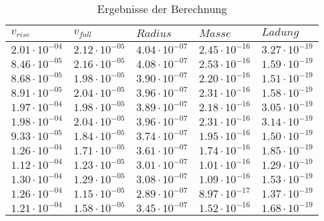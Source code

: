 \begin{table}
\caption{Ergebnisse der Berechnung}
\label{tab:ergebnisse}
\centering
\begin{tabular}{lllll}
\toprule
$v_{rise}$ & $v_{fall}$ & $Radius$ & $Masse$ & $Ladung$ \\
\midrule
$\mathrm{2.01 \cdot 10^{-04}}$ & $\mathrm{2.12 \cdot 10^{-05}}$ & $\mathrm{4.04 \cdot 10^{-07}}$ & $\mathrm{2.45 \cdot 10^{-16}}$ & $\mathrm{3.27 \cdot 10^{-19}}$ \\
$\mathrm{8.46 \cdot 10^{-05}}$ & $\mathrm{2.16 \cdot 10^{-05}}$ & $\mathrm{4.08 \cdot 10^{-07}}$ & $\mathrm{2.53 \cdot 10^{-16}}$ & $\mathrm{1.59 \cdot 10^{-19}}$ \\
$\mathrm{8.68 \cdot 10^{-05}}$ & $\mathrm{1.98 \cdot 10^{-05}}$ & $\mathrm{3.90 \cdot 10^{-07}}$ & $\mathrm{2.20 \cdot 10^{-16}}$ & $\mathrm{1.51 \cdot 10^{-19}}$ \\
$\mathrm{8.91 \cdot 10^{-05}}$ & $\mathrm{2.04 \cdot 10^{-05}}$ & $\mathrm{3.96 \cdot 10^{-07}}$ & $\mathrm{2.31 \cdot 10^{-16}}$ & $\mathrm{1.58 \cdot 10^{-19}}$ \\
$\mathrm{1.97 \cdot 10^{-04}}$ & $\mathrm{1.98 \cdot 10^{-05}}$ & $\mathrm{3.89 \cdot 10^{-07}}$ & $\mathrm{2.18 \cdot 10^{-16}}$ & $\mathrm{3.05 \cdot 10^{-19}}$ \\
$\mathrm{1.98 \cdot 10^{-04}}$ & $\mathrm{2.04 \cdot 10^{-05}}$ & $\mathrm{3.96 \cdot 10^{-07}}$ & $\mathrm{2.31 \cdot 10^{-16}}$ & $\mathrm{3.14 \cdot 10^{-19}}$ \\
$\mathrm{9.33 \cdot 10^{-05}}$ & $\mathrm{1.84 \cdot 10^{-05}}$ & $\mathrm{3.74 \cdot 10^{-07}}$ & $\mathrm{1.95 \cdot 10^{-16}}$ & $\mathrm{1.50 \cdot 10^{-19}}$ \\
$\mathrm{1.26 \cdot 10^{-04}}$ & $\mathrm{1.71 \cdot 10^{-05}}$ & $\mathrm{3.61 \cdot 10^{-07}}$ & $\mathrm{1.74 \cdot 10^{-16}}$ & $\mathrm{1.85 \cdot 10^{-19}}$ \\
$\mathrm{1.12 \cdot 10^{-04}}$ & $\mathrm{1.23 \cdot 10^{-05}}$ & $\mathrm{3.01 \cdot 10^{-07}}$ & $\mathrm{1.01 \cdot 10^{-16}}$ & $\mathrm{1.29 \cdot 10^{-19}}$ \\
$\mathrm{1.30 \cdot 10^{-04}}$ & $\mathrm{1.29 \cdot 10^{-05}}$ & $\mathrm{3.08 \cdot 10^{-07}}$ & $\mathrm{1.09 \cdot 10^{-16}}$ & $\mathrm{1.53 \cdot 10^{-19}}$ \\
$\mathrm{1.26 \cdot 10^{-04}}$ & $\mathrm{1.15 \cdot 10^{-05}}$ & $\mathrm{2.89 \cdot 10^{-07}}$ & $\mathrm{8.97 \cdot 10^{-17}}$ & $\mathrm{1.37 \cdot 10^{-19}}$ \\
$\mathrm{1.21 \cdot 10^{-04}}$ & $\mathrm{1.58 \cdot 10^{-05}}$ & $\mathrm{3.45 \cdot 10^{-07}}$ & $\mathrm{1.52 \cdot 10^{-16}}$ & $\mathrm{1.68 \cdot 10^{-19}}$ \\

\end{tabular}
\end{table}
